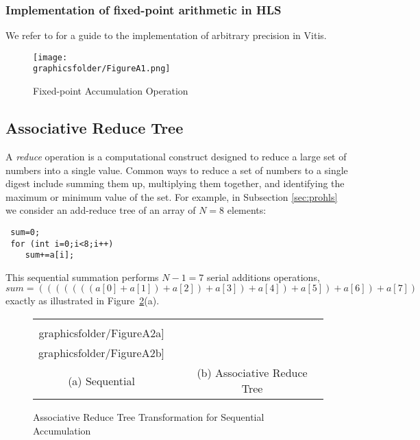 \documentclass[12pt,american]{article}
\newcommand{\graphicsfolder}{./graphics}
\begin{document}
\subsubsection{Implementation of fixed-point arithmetic in HLS}\label{sec:fixpre}

We refer to \citet{vitis-hls-ug1399} for a guide to the implementation of arbitrary precision in Vitis. 
\clearpage
\begin{figure}[ht!]
\caption{Fixed-point Accumulation Operation}
\begin{center}
\texttt{[image: \\graphicsfolder/FigureA1.png]}
\end{center}
\label{fig:acc:fixpre}
\end{figure}

\subsection{Associative Reduce Tree}\label{app:ass:red:tree}

A {\em reduce} operation is a computational construct designed to reduce a large set of numbers into a single value. Common ways to reduce a set of numbers to a single digest include summing them up, multiplying them together, and identifying the maximum or minimum value of the set.
For example, in Subsection \ref{sec:prohls} we consider an add-reduce tree of an array of $N=8$ elements:
\begin{verbatim}
 sum=0;
 for (int i=0;i<8;i++)
    sum+=a[i];
\end{verbatim}
This sequential summation performs $N-1=7$ serial additions operations,
\begin{equation*}
sum=(((((((a[0]+a[1])+a[2])+a[3])+a[4])+a[5])+a[6])+a[7])
\end{equation*}
exactly as illustrated in Figure~\ref{areduce8}(a).

\begin{figure}[!htbp]
\begin{center}
\begin{tabular}{ccc}
\texttt{[image: \\graphicsfolder/FigureA2a]} & \hspace*{1cm} &
\texttt{[image: \\graphicsfolder/FigureA2b]} \\
(a) Sequential & &  (b) Associative Reduce Tree \\
\end{tabular}
\end{center}
\caption{Associative Reduce Tree Transformation for Sequential
Accumulation}\label{areduce8} 
\end{figure}
\end{document}
